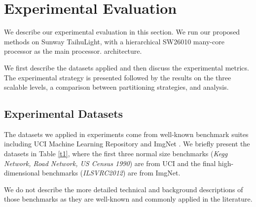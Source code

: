 \documentclass[10pt,journal,compsoc]{IEEEtran}
\begin{document}
{%


\section{Experimental Evaluation}
We describe our experimental evaluation in this section. We run our proposed methods on Sunway TaihuLight, with a hierarchical SW26010 many-core processor as the main processor. architecture. 

We first describe the datasets applied and then discuss the experimental metrics. The experimental strategy is presented followed by the results on the three scalable levels, a comparison between partitioning strategies, and analysis. 


\subsection{Experimental Datasets}
The datasets we applied in experiments come from well-known benchmark suites including UCI Machine Learning Repository\cite{uci} and ImgNet \cite{imgnet}. We briefly present the datasets in Table \ref{t1}, where the first three normal size benchmarks ({\it Kegg Network, Road Network, US Census 1990}) are from UCI and the final high-dimensional benchmarks ({\it ILSVRC2012}) are from ImgNet.

We do not describe the more detailed technical and background descriptions of those benchmarks as they are well-known and commonly applied in the literature. 

}
\end{document}
